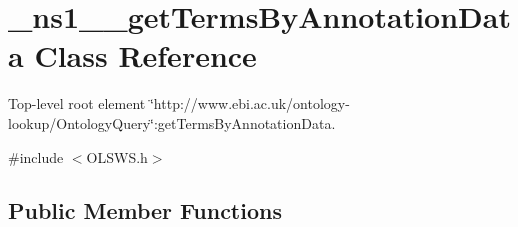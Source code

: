 \hypertarget{class__ns1____getTermsByAnnotationData}{
\section{\_\-ns1\_\-\_\-getTermsByAnnotationData Class Reference}
\label{class__ns1____getTermsByAnnotationData}
}


Top-\/level root element \char`\"{}http://www.ebi.ac.uk/ontology-\/lookup/OntologyQuery\char`\"{}:getTermsByAnnotationData.  




{\ttfamily \#include $<$OLSWS.h$>$}

\subsection*{Public Member Functions}
